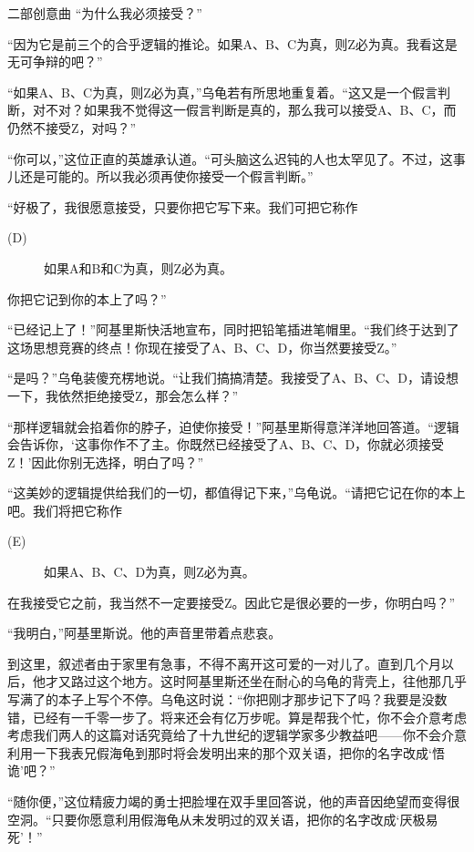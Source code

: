 \begin{dialog}{二部创意曲}
“为什么我必须接受？”

“因为它是前三个的合乎逻辑的推论。如果A、B、C为真，则Z必为真。我看这是无可争辩的吧？”

“如果A、B、C为真，则Z必为真，”乌龟若有所思地重复着。“这又是一个假言判断，对不对？如果我不觉得这一假言判断是真的，那么我可以接受A、B、C，而仍然不接受Z，对吗？”

“你可以，”这位正直的英雄承认道。“可头脑这么迟钝的人也太罕见了。不过，这事儿还是可能的。所以我必须再使你接受一个假言判断。”

“好极了，我很愿意接受，只要你把它写下来。我们可把它称作
\begin{description}
\item[(D)] 如果A和B和C为真，则Z必为真。
\end{description}
你把它记到你的本上了吗？”

“已经记上了！”阿基里斯快活地宣布，同时把铅笔插进笔帽里。“我们终于达到了这场思想竞赛的终点！你现在接受了A、B、C、D，你当然要接受Z。”

“是吗？”乌龟装傻充楞地说。“让我们搞搞清楚。我接受了A、B、C、D，请设想一下，我依然拒绝接受Z，那会怎么样？”

“那样逻辑就会掐着你的脖子，迫使你接受！”阿基里斯得意洋洋地回答道。“逻辑会告诉你，‘这事你作不了主。你既然已经接受了A、B、C、D，你就必须接受Z！’因此你别无选择，明白了吗？”

“这美妙的逻辑提供给我们的一切，都值得记下来，”乌龟说。“请把它记在你的本上吧。我们将把它称作
\begin{description}
\item[(E)] 如果A、B、C、D为真，则Z必为真。
\end{description}
在我接受它之前，我当然不一定要接受Z。因此它是很必要的一步，你明白吗？”

“我明白，”阿基里斯说。他的声音里带着点悲哀。

到这里，叙述者由于家里有急事，不得不离开这可爱的一对儿了。直到几个月以后，他才又路过这个地方。这时阿基里斯还坐在耐心的乌龟的背壳上，往他那几乎写满了的本子上写个不停。乌龟这时说：“你把刚才那步记下了吗？我要是没数错，已经有一千零一步了。将来还会有亿万步呢。算是帮我个忙，你不会介意考虑考虑我们两人的这篇对话究竟给了十九世纪的逻辑学家多少教益吧——你不会介意利用一下我表兄假海龟到那时将会发明出来的那个双关语，把你的名字改成‘悟诡’吧？”

“随你便，”这位精疲力竭的勇士把脸埋在双手里回答说，他的声音因绝望而变得很空洞。“只要你愿意利用假海龟从未发明过的双关语，把你的名字改成‘厌极易死’！”

\end{dialog}
